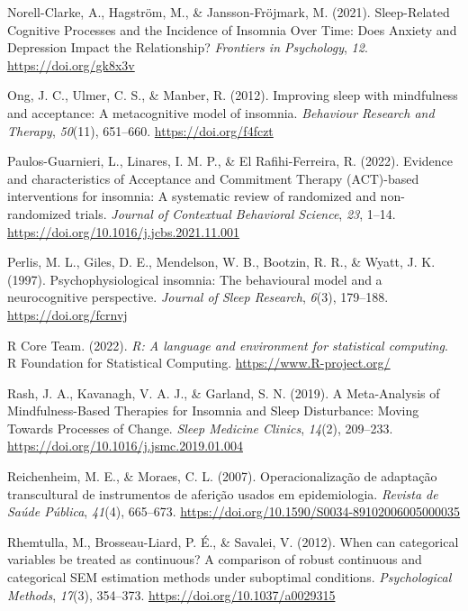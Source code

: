 \documentclass[
  ,doc,11pt, twoside,floatsintext]{apa6}
\newlength{\cslhangindent}
\newlength{\cslentryspacingunit} %
\newenvironment{CSLReferences}[2] %
 {%
  \setlength{\parindent}{0pt}
  \ifodd #1
  \let\oldpar\par
  \def\par{\hangindent=\cslhangindent\oldpar}
  \fi
  \setlength{\parskip}{#2\cslentryspacingunit}
 }%
 {}
\begin{document}
\begin{CSLReferences}{1}{0}
\leavevmode{}%
Norell-Clarke, A., Hagström, M., \& Jansson-Fröjmark, M. (2021). Sleep-{Related Cognitive Processes} and the {Incidence} of {Insomnia Over Time}: {Does Anxiety} and {Depression Impact} the {Relationship}? \emph{Frontiers in Psychology}, \emph{12}. \url{https://doi.org/gk8x3v}

\leavevmode{}%
Ong, J. C., Ulmer, C. S., \& Manber, R. (2012). Improving sleep with mindfulness and acceptance: {A} metacognitive model of insomnia. \emph{Behaviour Research and Therapy}, \emph{50}(11), 651--660. \url{https://doi.org/f4fczt}

\leavevmode{}%
Paulos-Guarnieri, L., Linares, I. M. P., \& El Rafihi-Ferreira, R. (2022). Evidence and characteristics of {Acceptance} and {Commitment Therapy} ({ACT})-based interventions for insomnia: {A} systematic review of randomized and non-randomized trials. \emph{Journal of Contextual Behavioral Science}, \emph{23}, 1--14. \url{https://doi.org/10.1016/j.jcbs.2021.11.001}

\leavevmode{}%
Perlis, M. L., Giles, D. E., Mendelson, W. B., Bootzin, R. R., \& Wyatt, J. K. (1997). Psychophysiological insomnia: The behavioural model and a neurocognitive perspective. \emph{Journal of Sleep Research}, \emph{6}(3), 179--188. \url{https://doi.org/fcrnvj}

\leavevmode{}%
R Core Team. (2022). \emph{R: A language and environment for statistical computing}. R Foundation for Statistical Computing. \url{https://www.R-project.org/}

\leavevmode{}%
Rash, J. A., Kavanagh, V. A. J., \& Garland, S. N. (2019). A {Meta-Analysis} of {Mindfulness-Based Therapies} for {Insomnia} and {Sleep Disturbance}: {Moving Towards Processes} of {Change}. \emph{Sleep Medicine Clinics}, \emph{14}(2), 209--233. \url{https://doi.org/10.1016/j.jsmc.2019.01.004}

\leavevmode{}%
Reichenheim, M. E., \& Moraes, C. L. (2007). {Operacionalização de adaptação transcultural de instrumentos de aferição usados em epidemiologia}. \emph{Revista de Saúde Pública}, \emph{41}(4), 665--673. \url{https://doi.org/10.1590/S0034-89102006005000035}

\leavevmode{}%
Rhemtulla, M., Brosseau-Liard, P. É., \& Savalei, V. (2012). When can categorical variables be treated as continuous? {A} comparison of robust continuous and categorical {SEM} estimation methods under suboptimal conditions. \emph{Psychological Methods}, \emph{17}(3), 354--373. \url{https://doi.org/10.1037/a0029315}


\end{CSLReferences}
\end{document}
